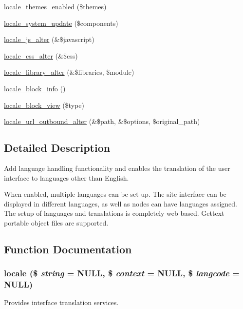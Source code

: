 \begin{DoxyCompactItemize}
\hyperlink{locale_8module_a0378f720a467d804640a979f956dd442}{locale\_\-themes\_\-enabled} (\$themes)
\item 
\hyperlink{locale_8module_a407031bef7c41d5a8f94d3d60cab1fcb}{locale\_\-system\_\-update} (\$components)
\item 
\hyperlink{locale_8module_a8bb6cc68121ba7213df8d6a33b372853}{locale\_\-js\_\-alter} (\&\$javascript)
\item 
\hyperlink{locale_8module_a0767007b96aa70dfc1b4bdcde924b5f3}{locale\_\-css\_\-alter} (\&\$css)
\item 
\hyperlink{locale_8module_acf4b87e784cf2fe602bdc4e5a5771005}{locale\_\-library\_\-alter} (\&\$libraries, \$module)
\item 
\hyperlink{locale_8module_a925049f0f5d2fd9807dc5e8288211b9f}{locale\_\-block\_\-info} ()
\item 
\hyperlink{locale_8module_a3f0dec6a460840ac379294be6db21437}{locale\_\-block\_\-view} (\$type)
\item 
\hyperlink{locale_8module_aa085fd2fb014798616bc7efbbd94de1a}{locale\_\-url\_\-outbound\_\-alter} (\&\$path, \&\$options, \$original\_\-path)
\end{DoxyCompactItemize}


\subsection{Detailed Description}
Add language handling functionality and enables the translation of the user interface to languages other than English.

When enabled, multiple languages can be set up. The site interface can be displayed in different languages, as well as nodes can have languages assigned. The setup of languages and translations is completely web based. Gettext portable object files are supported. 

\subsection{Function Documentation}
\hypertarget{locale_8module_aa8108c8ecfcedbde1cf0d40606d5b2f5}{
\subsubsection[{locale}]{\setlength{\rightskip}{0pt plus 5cm}locale (\$ {\em string} = {\ttfamily NULL}, \/  \$ {\em context} = {\ttfamily NULL}, \/  \$ {\em langcode} = {\ttfamily NULL})}}
\label{locale_8module_aa8108c8ecfcedbde1cf0d40606d5b2f5}
Provides interface translation services.

